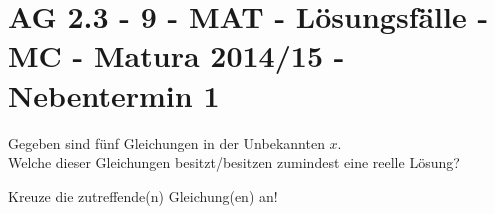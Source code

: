 \section{AG 2.3 - 9 - MAT - Lösungsfälle - MC - Matura 2014/15 - Nebentermin 1}

\begin{beispiel}[AG 2.3]{1} %
				Gegeben sind fünf Gleichungen in der Unbekannten $x$.\\
				
				Welche dieser Gleichungen besitzt/besitzen zumindest eine reelle Lösung?
				
				Kreuze die zutreffende(n) Gleichung(en) an!
				
\end{beispiel}
